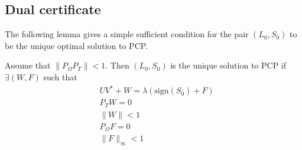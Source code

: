 \documentclass{../common/projectreport}
\begin{document}
\subsection{Dual certificate}
The following lemma gives a simple sufficient condition for the pair $(L_0,S_0)$ to be the unique optimal solution to PCP.

\begin{lemma}
Assume that $\|P_\Omega P_T \| < 1$. Then $(L_0,S_0)$ is the unique solution to PCP if $\exists (W, F)$ such that
\begin{equation}
\begin{aligned}
& UV^* + W = \lambda(\text{sign}(S_0) + F) \\
& P_T W = 0 \\
& \|W\|<1 \\
& P_\Omega F = 0 \\
& \|F\|_\infty < 1
\end{aligned}
\end{equation}

\end{lemma}
\end{document}
